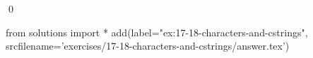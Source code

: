 
\begin{ex}
  \label{ex:17-18-characters-and-cstrings}
  
  \qed
\end{ex}
\begin{python0}
from solutions import *
add(label="ex:17-18-characters-and-cstrings",
    srcfilename='exercises/17-18-characters-and-cstrings/answer.tex')
\end{python0}
